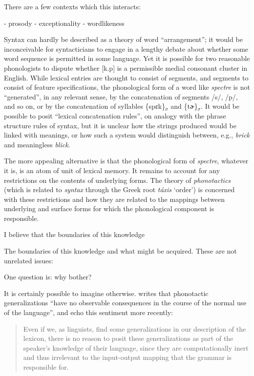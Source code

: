 There are a few contexts which this interacts:

- prosody
- exceptionality
- wordlikeness

Syntax can hardly be described as a theory of word ``arrangement''; it would be inconceivable for syntacticians to engage in a lengthy debate about whether some word sequence is permitted in some language. Yet it is possible for two reasonable phonologists to dispute whether [k.p] is a permissible medial consonant cluster in English. While lexical entries are thought to consist of segments, and segments to consist of feature specifications, the phonological form of a word like \emph{spectre} is not ``generated'', in any relevant sense, by the concatenation of segments /s/, /p/, and so on, or by the concatenation of syllables \{spɛk\}$_{\sigma}$ and \{tɚ\}$_{\sigma}$. It would be possible to posit ``lexical concatenation rules'', on analogy with the phrase structure rules of syntax, but it is unclear how the strings produced would be linked with meanings, or how such a system would distinguish between, e.g., \emph{brick} and meaningless \emph{blick}.

The more appealing alternative is that the phonological form of \emph{spectre}, whatever it is, is an atom of unit of lexical memory. It remains to account for any restrictions on the contents of underlying forms. The theory of \emph{phonotactics} (which is related to \emph{syntax} through the Greek root \emph{táxis} `order') is concerned with these restrictions and how they are related to the mappings between underlying and surface forms for which the phonological component is responsible. 


I believe that the boundaries of this knowledge

The boundaries of this knowledge
and what might be acquired.
These are not unrelated issues:

One question is: why bother?

It is certainly possible to imagine otherwise. \citet[][320]{Zimmer1969} writes that phonotactic generalizations ``have no observable consequences in the course of the normal use of the language'', and \citeauthor{PE} echo this sentiment more recently:

\begin{quote}
Even if we, as linguists, find some generalizations in our description of the lexicon, there is no reason to posit these generalizations as part of the speaker's knowledge of their language, since they are computationally inert and thus irrelevant to the input-output mapping that the grammar is responsible for. \citep[][18]{PE}
\end{quote}

